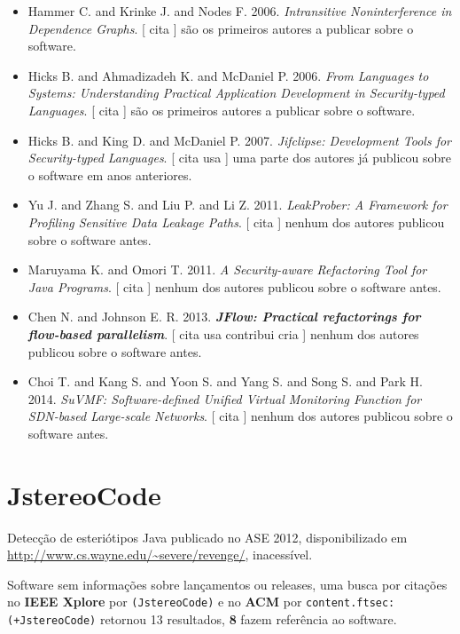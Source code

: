 \begin{itemize}
\item Hammer C. and Krinke J. and Nodes F.
      2006.
        \textit{ Intransitive Noninterference in Dependence Graphs}.
      [
          cita
      ]
são os primeiros autores a publicar sobre o software.
\item Hicks B. and Ahmadizadeh K. and McDaniel P.
      2006.
        \textit{ From Languages to Systems: Understanding Practical Application Development in Security-typed Languages}.
      [
          cita
      ]
são os primeiros autores a publicar sobre o software.
\item Hicks B. and King D. and McDaniel P.
      2007.
        \textit{ Jifclipse: Development Tools for Security-typed Languages}.
      [
          cita
          usa
      ]
uma parte dos autores já publicou sobre o software em anos anteriores.
\item Yu J. and Zhang S. and Liu P. and Li Z.
      2011.
        \textit{ LeakProber: A Framework for Profiling Sensitive Data Leakage Paths}.
      [
          cita
      ]
nenhum dos autores publicou sobre o software antes.
\item Maruyama K. and Omori T.
      2011.
        \textit{ A Security-aware Refactoring Tool for Java Programs}.
      [
          cita
      ]
nenhum dos autores publicou sobre o software antes.
\item Chen N. and Johnson E. R.
      2013.
        \textbf{\textit{ JFlow: Practical refactorings for flow-based parallelism}}.
      [
          cita
          usa
          contribui
          cria
      ]
nenhum dos autores publicou sobre o software antes.
\item Choi T. and Kang S. and Yoon S. and Yang S. and Song S. and Park H.
      2014.
        \textit{ SuVMF: Software-defined Unified Virtual Monitoring Function for SDN-based Large-scale Networks}.
      [
          cita
      ]
nenhum dos autores publicou sobre o software antes.
\end{itemize}
\section{JstereoCode}

Detecção de esteriótipos Java
publicado no ASE 2012,
disponibilizado em \url{http://www.cs.wayne.edu/~severe/revenge/},
inacessível.

Software sem informações sobre lançamentos ou releases,
uma busca por citações no {\bf IEEE Xplore} por
\texttt{(JstereoCode)}
e no {\bf ACM} por
\texttt{content.ftsec:(+JstereoCode)}
retornou
13 resultados,
{\bf 8} fazem referência ao software.


